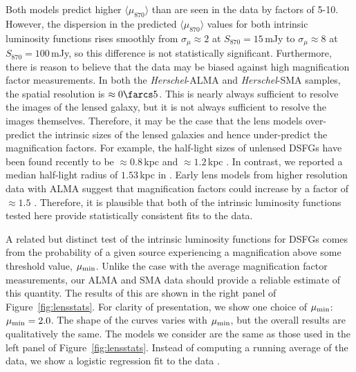 \documentclass[iop]{emulateapj}
\begin{document}

Both models predict higher $\langle\mu_{870}\rangle$ than are seen in the data
by factors of 5-10.  However, the dispersion in the predicted
$\langle\mu_{870}\rangle$ values for both intrinsic luminosity functions rises
smoothly from $\sigma_\mu \approx 2$ at $S_{870} = 15\,$mJy to $\sigma_\mu
\approx 8$ at $S_{870} = 100\,$mJy, so this difference is not statistically
significant.  Furthermore, there is reason to believe that the data may be
biased against high magnification factor measurements.  In both the {\it
Herschel}-ALMA and {\it Herschel}-SMA samples, the spatial resolution is
$\approx 0\farcs5$.  This is nearly always sufficient to resolve the images of
the lensed galaxy, but it is not always sufficient to resolve the images
themselves.  Therefore, it may be the case that the lens models over-predict
the intrinsic sizes of the lensed galaxies and hence under-predict the
magnification factors.  For example, the half-light sizes of unlensed DSFGs
have been found recently to be $\approx 0.8 \,$kpc \citep{Ikarashi:2014nr} and
$\approx1.2\,$kpc \citep{Simpson:2015ty}.  In contrast, we reported a median
half-light radius of $1.53\,$kpc in \citet{Bussmann:2013lr}.  Early lens models
from higher resolution data with ALMA suggest that magnification factors could
increase by a factor of $\approx 1.5$ \citep{Rybak:2015fk}.  Therefore, it is
plausible that both of the intrinsic luminosity functions tested here provide
statistically consistent fits to the data.

A related but distinct test of the intrinsic luminosity functions for DSFGs
comes from the probability of a given source experiencing a magnification above
some threshold value, $\mu_{\rm min}$.  Unlike the case with the average
magnification factor measurements, our ALMA and SMA data should provide a
reliable estimate of this quantity.  The results of this are shown in the right
panel of Figure~\ref{fig:lensstats}.  For clarity of presentation, we show one
choice of $\mu_{\rm min}$: $\mu_{\rm min} = 2.0$.  The shape of the curves
varies with  $\mu_{\rm min}$, but the overall results are qualitatively the
same.  The models we consider are the same as those used in the left panel of
Figure~\ref{fig:lensstats}.  Instead of computing a running average of the
data, we show a logistic regression fit to the data \citep[obtained with the
{\sc Scikit-learn} package;][]{scikitlearn}.
\end{document}
